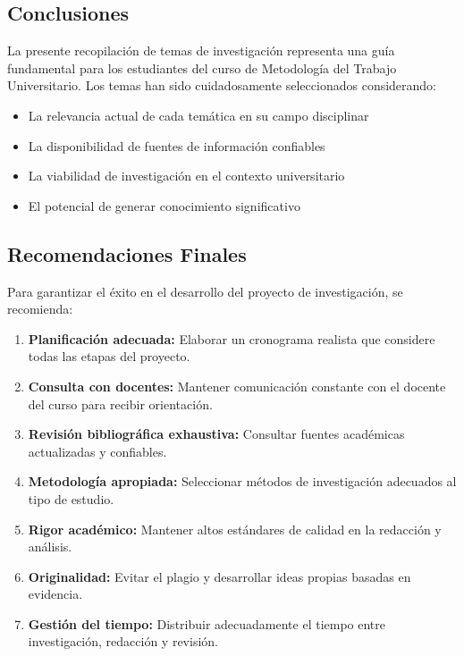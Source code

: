 \documentclass[12pt,a4paper]{article}
\begin{document}
\subsection*{Conclusiones}

La presente recopilación de temas de investigación representa una guía fundamental para los estudiantes del curso de Metodología del Trabajo Universitario. Los temas han sido cuidadosamente seleccionados considerando:

\begin{itemize}
  \item La relevancia actual de cada temática en su campo disciplinar
  \item La disponibilidad de fuentes de información confiables
  \item La viabilidad de investigación en el contexto universitario
  \item El potencial de generar conocimiento significativo
\end{itemize}

\subsection*{Recomendaciones Finales}

Para garantizar el éxito en el desarrollo del proyecto de investigación, se recomienda:

\begin{enumerate}
  \item \textbf{Planificación adecuada:} Elaborar un cronograma realista que considere todas las etapas del proyecto.
  
  \item \textbf{Consulta con docentes:} Mantener comunicación constante con el docente del curso para recibir orientación.
  
  \item \textbf{Revisión bibliográfica exhaustiva:} Consultar fuentes académicas actualizadas y confiables.
  
  \item \textbf{Metodología apropiada:} Seleccionar métodos de investigación adecuados al tipo de estudio.
  
  \item \textbf{Rigor académico:} Mantener altos estándares de calidad en la redacción y análisis.
  
  \item \textbf{Originalidad:} Evitar el plagio y desarrollar ideas propias basadas en evidencia.
  
  \item \textbf{Gestión del tiempo:} Distribuir adecuadamente el tiempo entre investigación, redacción y revisión.
\end{enumerate}
\end{document}
